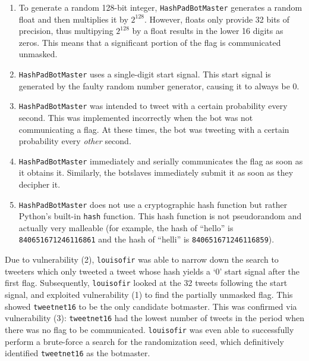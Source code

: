\documentclass[11pt, oneside]{article} %
\numberwithin{equation}{section} %
\numberwithin{figure}{section} %
\numberwithin{table}{section} %
\renewcommand{\c}[1]{\texttt{#1}}
\newcommand{\teamol}{\c{louisofir}}
\begin{document}
            \begin{enumerate}
				\item To generate a random 128-bit integer, \c{HashPadBotMaster} generates a random float and then multiplies it by $2^{128}$. However, floats only provide 32 bits of precision, thus multipying $2^{128}$ by a float results in the lower 16 digits as zeros. This means that a significant portion of the flag is communicated unmasked.
                
				\item \c{HashPadBotMaster} uses a single-digit start signal.  This start signal is generated by the faulty random number generator, causing it to always be $0$.
                
				\item \c{HashPadBotMaster} was intended to tweet with a certain probability every second.  This was implemented incorrectly when the bot was not communicating a flag.  At these times, the bot was tweeting with a certain probability every \emph{other} second.
                
				\item \c{HashPadBotMaster} immediately and serially communicates the flag as soon as it obtains it.  Similarly, the botslaves immediately submit it as soon as they decipher it.
                
				\item \c{HashPadBotMaster} does not use a cryptographic hash function but rather Python's built-in \c{hash} function.  This hash function is not pseudorandom and actually very malleable (for example, the hash of ``hello'' is \c{840651671246116861} and the hash of ``helli'' is \c{840651671246116859}).
                
			\end{enumerate}
            
			Due to vulnerability (2), \teamol{} was able to narrow down the search to tweeters which only tweeted a tweet whose hash yields a `0' start signal after the first flag.  Subsequently, \teamol{} looked at the 32 tweets following the start signal, and exploited vulnerability (1) to find the partially unmasked flag.  This showed \c{tweetnet16} to be the only candidate botmaster.  This was confirmed via vulnerability (3): \c{tweetnet16} had the lowest number of tweets in the period when there was no flag to be communicated.  \teamol{} was even able to successfully perform a brute-force a search for the randomization seed, which definitively identified \c{tweetnet16} as the botmaster.
\end{document}
